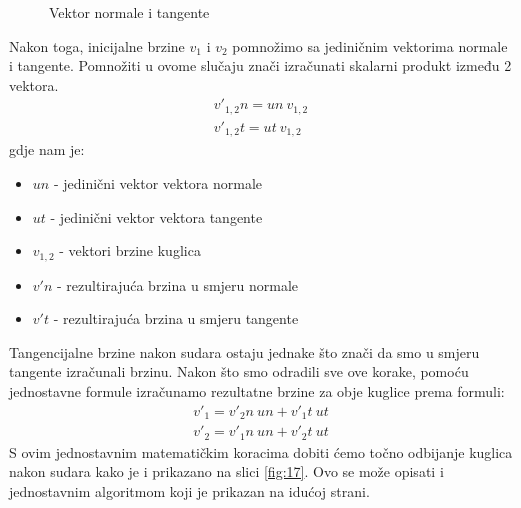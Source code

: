\begin{figure}[!http]
	\begin{center}
	\end{center}
	\caption {Vektor normale i tangente}
	\label{fig:18}
\end{figure}
Nakon toga, inicijalne brzine $v_{1}$ i $v_{2}$ pomnožimo sa jediničnim vektorima normale i tangente\cite{2}. Pomnožiti u ovome slučaju znači izračunati skalarni produkt između 2 vektora.
\begin{equation}\label{equ:dot_vector}
\begin{aligned}
		v'_{1,2}n = un\  v_{1,2} \\
		v'_{1,2}t = ut\ v_{1,2}
	\end{aligned}
\end{equation}
gdje nam je:
\begin{itemize}
	\item $un$ - jedinični vektor vektora normale
	\item $ut$ - jedinični vektor vektora tangente
	\item $v_{1,2}$ - vektori brzine kuglica
	\item $v'n$ - rezultirajuća brzina u smjeru normale
	\item  $v't$ - rezultirajuća brzina u smjeru tangente
\end{itemize}
Tangencijalne brzine nakon sudara ostaju jednake što znači da smo u smjeru tangente izračunali brzinu\cite{2}. Nakon što smo odradili sve ove korake, pomoću jednostavne formule izračunamo rezultatne brzine za obje kuglice prema formuli:
\begin{equation}\label{equ:final_vec}
	\begin{aligned}
		v'_{1} = v'_{2}n \ un + v'_{1}t \ ut \\
		v'_{2} = v'_{1}n \ un + v'{_2}t \ ut
		\end{aligned}
\end{equation}
S ovim jednostavnim matematičkim koracima dobiti ćemo točno odbijanje kuglica nakon sudara kako je i prikazano na slici \ref{fig:17}. Ovo se može opisati i jednostavnim algoritmom koji je prikazan na idućoj strani.
